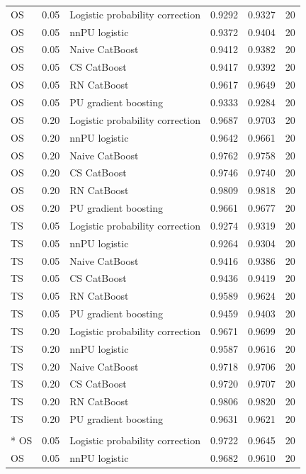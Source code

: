 \begin{longtable}{@{}p{0.65in}rp{2.85in}rrr@{}}
OS & 0.05 & Logistic probability correction & 0.9292 & 0.9327 & 20 \\
OS & 0.05 & nnPU logistic & 0.9372 & 0.9404 & 20 \\
OS & 0.05 & Naive CatBoost & 0.9412 & 0.9382 & 20 \\
OS & 0.05 & CS CatBoost & 0.9417 & 0.9392 & 20 \\
OS & 0.05 & RN CatBoost & 0.9617 & 0.9649 & 20 \\
OS & 0.05 & PU gradient boosting & 0.9333 & 0.9284 & 20 \\
\addlinespace[2pt]
OS & 0.20 & Logistic probability correction & 0.9687 & 0.9703 & 20 \\
OS & 0.20 & nnPU logistic & 0.9642 & 0.9661 & 20 \\
OS & 0.20 & Naive CatBoost & 0.9762 & 0.9758 & 20 \\
OS & 0.20 & CS CatBoost & 0.9746 & 0.9740 & 20 \\
OS & 0.20 & RN CatBoost & 0.9809 & 0.9818 & 20 \\
OS & 0.20 & PU gradient boosting & 0.9661 & 0.9677 & 20 \\
\addlinespace[2pt]
TS & 0.05 & Logistic probability correction & 0.9274 & 0.9319 & 20 \\
TS & 0.05 & nnPU logistic & 0.9264 & 0.9304 & 20 \\
TS & 0.05 & Naive CatBoost & 0.9416 & 0.9386 & 20 \\
TS & 0.05 & CS CatBoost & 0.9436 & 0.9419 & 20 \\
TS & 0.05 & RN CatBoost & 0.9589 & 0.9624 & 20 \\
TS & 0.05 & PU gradient boosting & 0.9459 & 0.9403 & 20 \\
\addlinespace[2pt]
TS & 0.20 & Logistic probability correction & 0.9671 & 0.9699 & 20 \\
TS & 0.20 & nnPU logistic & 0.9587 & 0.9616 & 20 \\
TS & 0.20 & Naive CatBoost & 0.9718 & 0.9706 & 20 \\
TS & 0.20 & CS CatBoost & 0.9720 & 0.9707 & 20 \\
TS & 0.20 & RN CatBoost & 0.9806 & 0.9820 & 20 \\
TS & 0.20 & PU gradient boosting & 0.9631 & 0.9621 & 20 \\
\addlinespace[2pt]
\pagebreak
\multicolumn{6}{l}{\textbf{Rice}}\\*
OS & 0.05 & Logistic probability correction & 0.9722 & 0.9645 & 20 \\
OS & 0.05 & nnPU logistic & 0.9682 & 0.9610 & 20 \\

\end{longtable}
